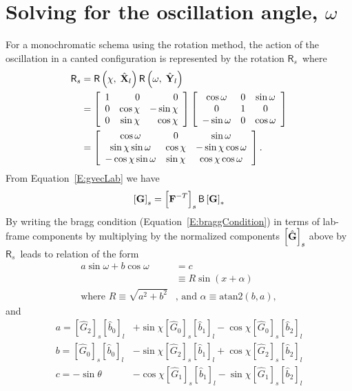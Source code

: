 \documentclass[12pt,letterpaper,final]{amsart}
\newcommand{\mbm}[1]{\ensuremath{\mbox{\boldmath$#1$}}}
\newcommand{\rmats}{\ensuremath{\mathsf{R}_s}}
\newcommand{\bmat}{\ensuremath{\mathsf{B}}}
\newcommand{\gvec}{\ensuremath{\mbm{\mathrm{G}}}}
\newcommand{\ghat}{\ensuremath{\hat{\mbm{\mathrm{G}}}}}
\newcommand{\defgrad}{\ensuremath{\mbm{\mathrm{F}}}}
\newcommand{\Xl}{\ensuremath{\hat{\mbm{\mathrm{X}}}_l}}
\newcommand{\Yl}{\ensuremath{\hat{\mbm{\mathrm{Y}}}_l}}
\newcommand{\labcomps}[1]{\left[#1\right]_l}
\newcommand{\samcomps}[1]{\left[#1\right]_s}
\newcommand{\rcpcomps}[1]{\left[#1\right]_*}
\newcommand{\eqnref}[1]{Equation~\ref{#1}}
\newcommand{\cow}{\ensuremath{\cos\omega}}
\newcommand{\siw}{\ensuremath{\sin\omega}}
\newcommand{\cox}{\ensuremath{\cos\chi}}
\newcommand{\six}{\ensuremath{\sin\chi}}
\newcommand{\hgZ}{\ensuremath{\hat{G}_0}}
\newcommand{\hgO}{\ensuremath{\hat{G}_1}}
\newcommand{\hgT}{\ensuremath{\hat{G}_2}}
\newcommand{\hbZ}{\ensuremath{\hat{b}_0}}
\newcommand{\hbO}{\ensuremath{\hat{b}_1}}
\newcommand{\hbT}{\ensuremath{\hat{b}_2}}
\newcommand{\rmat}[2]{\ensuremath{\mathsf{R}\left(#1,\;#2\right)}}
\begin{document}
\section{Solving for the oscillation angle, $\omega$}\label{S:oscill}
For a monochromatic schema using the rotation method, the action of the oscillation in a canted configuration is represented by the rotation \rmats\, where
\begin{align}
	\rmats &= \rmat{\chi}{\Xl}\rmat{\omega}{\Yl} \label{E:rmats} \\
	&= \left[\begin{array}{rrr}1&0&0\\0&\cox&-\six\\0&\six&\cox\end{array}\right]
	   \left[\begin{array}{ccc}\cow&0&\siw\\0&1&0\\-\siw&0&\cow\end{array}\right] \nonumber\\
	&= \left[\begin{array}{ccc} 
	       \cow     &  0   &      \siw \\
	       \six\siw & \cox & -\six\cow \\
	      -\cox\siw & \six &   \cox\cow
	   \end{array}\right] . \nonumber
\end{align}
From \eqnref{E:gvecLab} we have
\begin{equation}
    \samcomps{\gvec} = \samcomps{\defgrad^{-T}}\bmat\rcpcomps{\gvec} \label{E:ghatInSamp}
\end{equation}
By writing the bragg condition (\eqnref{E:braggCondition}) in terms of lab-frame components by multiplying by the normalized components $\samcomps{\ghat}$ above by \rmats\ leads to relation of the form 
\begin{align}
    a \siw + b \cow &= c \label{E:trig}\\
                    &\equiv R\sin{\left(x+\alpha\right)} \label{E:identity}\\
                    \mbox{where } R\equiv\sqrt{a^2 + b^2} &\mbox{, and } \alpha\equiv\mathrm{atan2}(b, a),
\end{align}
and 
\begin{align}
    a = \samcomps{\hgT}\labcomps{\hbZ} &+ \six\samcomps{\hgZ}\labcomps{\hbO} - \cox\samcomps{\hgZ}\labcomps{\hbT}\\
    b = \samcomps{\hgZ}\labcomps{\hbZ} &- \six\samcomps{\hgT}\labcomps{\hbO} + \cox\samcomps{\hgT}\labcomps{\hbT}\\
    c =                  -\sin{\theta} &- \cox\samcomps{\hgO}\labcomps{\hbO} - \six\samcomps{\hgO}\labcomps{\hbT}
\end{align}
\end{document}
